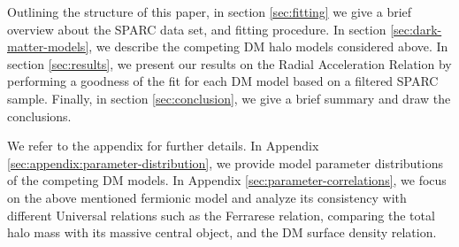 Outlining the structure of this paper, in section \ref{sec:fitting} we give a brief overview about the SPARC data set,  and fitting procedure. In section \ref{sec:dark-matter-models}, we describe the competing DM halo models considered above. In section \ref{sec:results}, we present our results on the Radial Acceleration Relation by performing a goodness of the fit for each DM model based on a filtered SPARC sample. Finally, in section \ref{sec:conclusion}, we give a brief summary and draw the conclusions.

We refer to the appendix for further details. In Appendix \ref{sec:appendix:parameter-distribution}, we provide model parameter distributions of the competing DM models. In Appendix \ref{sec:parameter-correlations}, we focus on the above mentioned fermionic model and analyze its consistency with different Universal relations such as the Ferrarese relation, comparing the total halo mass with its massive central object, and the DM surface density relation.

